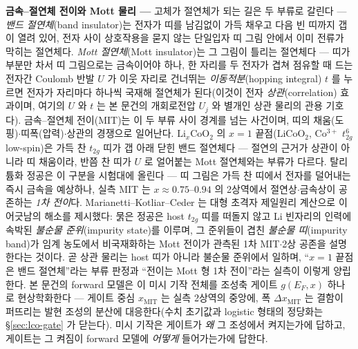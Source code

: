 \begin{bgbox}
\textbf{금속--절연체 전이와 Mott 물리 ---} 고체가 절연체가 되는 길은 두 부류로 갈린다 ---
\emph{밴드 절연체}(band insulator)는 전자가 띠를 남김없이 가득 채우고 다음 빈 띠까지 갭이 열려 있어,
전자 사이 상호작용을 묻지 않는 단일입자 띠 그림 안에서 이미 전류가 막히는 절연체다.
\emph{Mott 절연체}(Mott insulator)는 그 그림이 틀리는 절연체다 --- 띠가 부분만 차서 띠 그림으로는
금속이어야 하나, 한 자리를 두 전자가 겹쳐 점유할 때 드는 전자간 Coulomb 반발 $U$ 가 이웃 자리로 건너뛰는
\emph{이동적분}(hopping integral) $t$ 를 누르면 전자가 자리마다 하나씩 국재해 절연체가
된다\cite{mott1968,imada1998}(이것이 전자 \emph{상관}(correlation) 효과이며, 여기의 $U$ 와 $t$ 는 본 문건의
개회로전압 $U_j$ 와 별개인 상관 물리의 관용 기호다). 금속--절연체 전이(MIT)는 이 두 부류 사이 경계를 넘는
사건이며, 띠의 채움(도핑)$\cdot$띠폭(압력)$\cdot$상관의 경쟁으로 일어난다\cite{imada1998}.
$\mathrm{Li}_x\mathrm{CoO_2}$ 의 $x{=}1$ 끝점($\mathrm{LiCoO_2}$, Co$^{3+}$ $t_{2g}^6$ low-spin)은 가득 찬
$t_{2g}$ 띠가 갭 아래 닫힌 밴드 절연체다 --- 절연의 근거가 상관이 아니라 띠 채움이라, 반쯤 찬 띠가 $U$ 로
얼어붙는 Mott 절연체와는 부류가 다르다\cite{menetrier1999}. 탈리튬화 정공은 이 구분을 시험대에 올린다 ---
띠 그림은 가득 찬 띠에서 전자를 덜어내는 즉시 금속을 예상하나, 실측 MIT 는 $x\approx0.75$--$0.94$ 의
2상역에서 절연상$\cdot$금속상이 공존하는 \emph{1차 전이}다\cite{menetrier1999,reimers1992,motohashi2009}.
Marianetti--Kotliar--Ceder 는 대형 초격자 제일원리 계산으로 이 어긋남의 해소를 제시했다: 묽은 정공은 host
$t_{2g}$ 띠를 떠돌지 않고 Li 빈자리의 인력에 속박된 \emph{불순물 준위}(impurity state)를 이루며, 그
준위들이 겹친 \emph{불순물 띠}(impurity band)가 임계 농도에서 비국재화하는 Mott 전이가 관측된 1차
MIT$\cdot$2상 공존을 설명한다는 것이다\cite{marianetti2004}. 곧 상관 물리는 host 띠가 아니라 불순물
준위에서 일하며, ``$x{=}1$ 끝점은 밴드 절연체''라는 부류 판정과 ``전이는 Mott 형 1차 전이''라는 실측이
이렇게 양립한다. 본 문건의 forward 모델은 이 미시 기작 전체를 조성축 게이트 $g(E_F,x)$ 하나로 현상학화한다
--- 게이트 중심 $x_\mathrm{MIT}$ 는 실측 2상역의 중앙에, 폭 $\Delta x_\mathrm{MIT}$ 는 결함이 퍼뜨리는 발현
조성의 분산에 대응한다(수치 초기값과 logistic 형태의 정당화는 \S\ref{sec:lco-gate} 가 닫는다). 미시 기작은
게이트가 \emph{왜} 그 조성에서 켜지는가에 답하고, 게이트는 그 켜짐이 forward 모델에 \emph{어떻게}
들어가는가에 답한다.
\end{bgbox}

